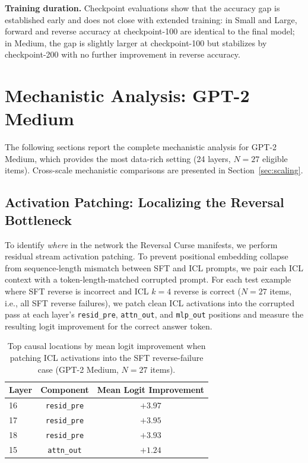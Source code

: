 \documentclass[11pt]{article}
\begin{document}
\textbf{Training duration.} Checkpoint evaluations show that the accuracy gap
is established early and does not close with extended training: in Small and
Large, forward and reverse accuracy at checkpoint-100 are identical to the final
model; in Medium, the gap is slightly larger at checkpoint-100 but stabilizes
by checkpoint-200 with no further improvement in reverse accuracy.

\section{Mechanistic Analysis: GPT-2 Medium}
\label{sec:mechanistic}

The following sections report the complete mechanistic analysis for GPT-2
Medium, which provides the most data-rich setting (24 layers, $N=27$ eligible
items). Cross-scale mechanistic comparisons are presented in
Section~\ref{sec:scaling}.

\subsection{Activation Patching: Localizing the Reversal Bottleneck}
\label{sec:patching}

To identify \emph{where} in the network the Reversal Curse manifests, we
perform residual stream activation patching. To prevent positional embedding
collapse from sequence-length mismatch between SFT and ICL prompts, we pair
each ICL context with a token-length-matched corrupted prompt. For each test
example where SFT reverse is incorrect and ICL $k=4$ reverse is correct
($N=27$ items, i.e., all SFT reverse failures), we patch clean ICL activations
into the corrupted pass at each layer's \texttt{resid\_pre},
\texttt{attn\_out}, and \texttt{mlp\_out} positions and measure the resulting
logit improvement for the correct answer token.

\begin{table}[h]
\centering
\caption{Top causal locations by mean logit improvement when patching ICL
activations into the SFT reverse-failure case (GPT-2 Medium, $N=27$ items).}
\label{tab:patching}
\begin{tabular}{lcc}
\toprule
\textbf{Layer} & \textbf{Component} & \textbf{Mean Logit Improvement} \\
\midrule
16 & \texttt{resid\_pre} & $+3.97$ \\
17 & \texttt{resid\_pre} & $+3.95$ \\
18 & \texttt{resid\_pre} & $+3.93$ \\
15 & \texttt{attn\_out}  & $+1.24$ \\
\bottomrule
\end{tabular}
\end{table}
\end{document}
